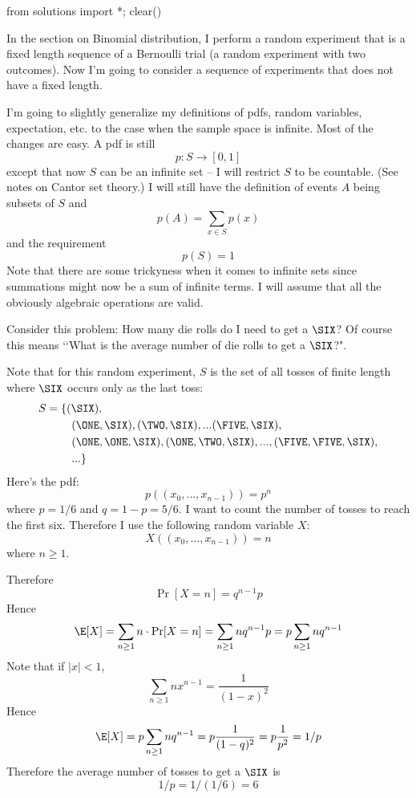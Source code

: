 \begin{python0}
from solutions import *; clear()
\end{python0}

In the section on Binomial distribution, I perform a random experiment that is a fixed
length sequence of a Bernoulli trial (a random experiment with two outcomes).
Now I'm going to consider a sequence of experiments that does not have a fixed length.

I'm going to slightly generalize my definitions of
pdfs, random variables, expectation, etc. to the case when the sample space
is infinite.
Most of the changes are easy.
A pdf is still
\[
p: S \rightarrow [0,1]
\]
except that now $S$ can be an infinite set -- I will restrict
$S$ to be countable.
(See notes on Cantor set theory.)
I will still have the definition of events $A$ being subsets of $S$
and
\[
p(A) = \sum_{x \in S} p(x)
\]
and the requirement
\[
p(S) = 1
\]
Note that there are some trickyness when it comes to infinite sets
since summations might now be a sum of infinite terms.
I will assume that all the obviously algebraic operations are valid.

Consider this problem:
How many die rolls do I need to get a $\SIX$?
Of course this means \lq\lq What is the average number of
die rolls to get a $\SIX$?".

Note that for this random experiment, $S$ is the set of all tosses of
finite length where $\SIX$ occurs only as the last toss:
\begin{align*}
  S &= \{(\SIX), \\
  &\hspace{0.8cm} (\ONE, \SIX), (\TWO, \SIX), ... (\FIVE, \SIX), \\
  &\hspace{0.8cm} (\ONE, \ONE, \SIX), (\ONE, \TWO, \SIX), ..., (\FIVE, \FIVE, \SIX), \\
  &\hspace{0.8cm} ...\}
\end{align*}
Here's the pdf:
\[
p((x_0, ..., x_{n - 1})) = p^n
\]
where $p = 1/6$ and $q = 1 - p = 5/6$.
I want to count the number of tosses to reach the first six.
Therefore I use the following random variable $X$:
\[
X((x_0, ..., x_{n - 1})) = n
\]
where $n \geq 1$.

Therefore
\[
\Pr[X = n] = q^{n-1}p
\]
Hence
\[
\E[X] = \sum_{n \geq 1} n \cdot \Pr[X = n] = \sum_{n \geq 1} n q^{n-1}p = p \sum_{n \geq 1} nq^{n - 1}
\]
Note that if $|x| < 1$,
\[
\sum_{n \geq 1} nx^{n - 1} = \frac{1}{(1 - x)^2}
\]
Hence
\[
\E[X] = p \sum_{n \geq 1} nq^{n - 1} = p \frac{1}{(1 - q)^2} = p \frac{1}{p^2} = 1/p
\]
Therefore the average number of tosses to get a $\SIX$ is
\[
1/p = 1/(1/6) = 6
\]

